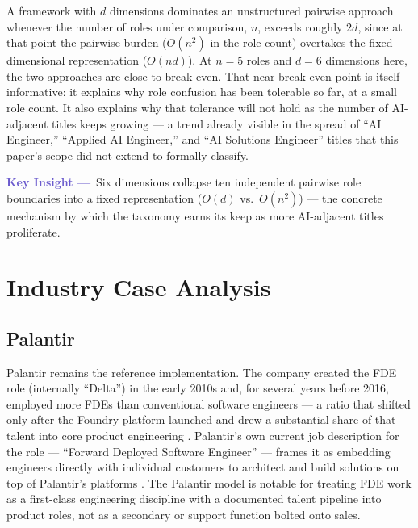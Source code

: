\documentclass[journal]{IEEEtran}
\begin{document}
A framework with $d$ dimensions dominates an unstructured pairwise approach whenever the number of roles under comparison, $n$, exceeds roughly $2d$, since at that point the pairwise burden ($O(n^2)$ in the role count) overtakes the fixed dimensional representation ($O(nd)$). At $n=5$ roles and $d=6$ dimensions here, the two approaches are close to break-even. That near break-even point is itself informative: it explains why role confusion has been tolerable so far, at a small role count. It also explains why that tolerance will not hold as the number of AI-adjacent titles keeps growing --- a trend already visible in the spread of ``AI Engineer,'' ``Applied AI Engineer,'' and ``AI Solutions Engineer'' titles that this paper's scope did not extend to formally classify.

\begin{mdframed}[linecolor=slateblue, linewidth=1.2pt, backgroundcolor=slateblue!6,
  innerleftmargin=8pt, innerrightmargin=8pt, innertopmargin=6pt, innerbottommargin=6pt,
  roundcorner=4pt]
\noindent\textbf{\textcolor{slateblue}{Key Insight ---}}~Six dimensions collapse ten independent pairwise role boundaries into a fixed representation ($O(d)$ vs.\ $O(n^2)$) --- the concrete mechanism by which the taxonomy earns its keep as more AI-adjacent titles proliferate.
\end{mdframed}

\section{Industry Case Analysis}
\label{sec:cases}

\subsection{Palantir}

Palantir remains the reference implementation. The company created the FDE role (internally ``Delta'') in the early 2010s and, for several years before 2016, employed more FDEs than conventional software engineers --- a ratio that shifted only after the Foundry platform launched and drew a substantial share of that talent into core product engineering \cite{orosz2025fde}. Palantir's own current job description for the role --- ``Forward Deployed Software Engineer'' --- frames it as embedding engineers directly with individual customers to architect and build solutions on top of Palantir's platforms \cite{palantir2026fdse}. The Palantir model is notable for treating FDE work as a first-class engineering discipline with a documented talent pipeline into product roles, not as a secondary or support function bolted onto sales.
\end{document}
